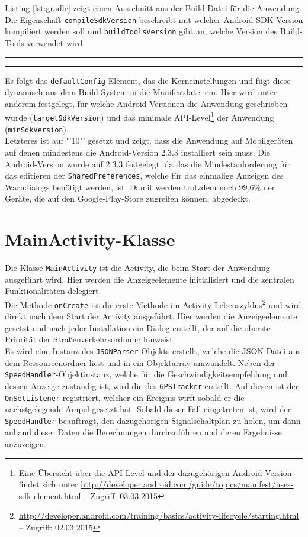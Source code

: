 Listing \ref{lst:gradle} zeigt einen Ausschnitt aus der Build-Datei für die Anwendung. \\
Die Eigenschaft \texttt{compileSdkVersion} beschreibt mit welcher Android \gls{SDK} Version kompiliert werden soll und \texttt{buildToolsVersion} gibt an, welche Version des Build-Tools verwendet wird.
\begin{center}
\rule{35em}{0.5pt}  \rule{35em}{0.5pt}
\end{center}
Es folgt das \texttt{defaultConfig} Element, das die Kerneinstellungen und fügt diese dynamisch aus dem Build-System in die  Manifestdatei ein. Hier wird unter anderem festgelegt, für welche Android Versionen die Anwendung geschrieben wurde (\texttt{targetSdkVersion}) und das minimale \gls{API}-Level\footnote{ Eine Übersicht über die \gls{API}-Level und der dazugehörigen Android-Version findet sich unter \url{http://developer.android.com/guide/topics/manifest/uses-sdk-element.html} -- Zugriff: 03.03.2015} der Anwendung (\texttt{minSdkVersion}).\\ 
Letzteres ist auf "'10"' gesetzt und zeigt, dass die Anwendung auf Mobilgeräten auf denen mindestens die Android-Version 2.3.3 installiert sein muss. 
Die Android-Version wurde auf 2.3.3 festgelegt, da das die Mindestanforderung für das editieren der \texttt{SharedPreferences}, welche für das einmalige Anzeigen des Warndialogs benötigt werden, ist. Damit werden trotzdem noch 99,6\% der Geräte, die auf den Google-Play-Store zugreifen können, abgedeckt. \cite{android_version} 
%
%
\clearpage
\section{MainActivity-Klasse}
Die Klasse \texttt{MainActivity} ist die \gls{Activity}, die beim Start der Anwendung ausgeführt wird.  Hier werden die Anzeigeelemente initialisiert und die zentralen Funktionalitäten delegiert.\\
Die Methode \texttt{onCreate} ist die erste Methode im \gls{Activity}-Lebenszyklus\footnote{ \url{http://developer.android.com/training/basics/activity-lifecycle/starting.html} -- Zugriff: 02.03.2015} und wird direkt nach dem Start der \gls{Activity} ausgeführt. Hier werden die Anzeigeelemente gesetzt und nach jeder Installation ein Dialog erstellt, der auf die oberste Priorität der Straßenverkehrsordnung hinweist.\\
Es wird eine Instanz des \texttt{JSONParser}-Objekts erstellt, welche die \gls{JSON}-Datei aus dem Ressourcenordner liest und in ein Objektarray umwandelt. Neben der \texttt{SpeedHandler}-Objektinstanz, welche für die Geschwindigkeitsempfehlung und dessen Anzeige zuständig ist, wird die des \texttt{GPSTracker} erstellt. Auf diesen ist der \texttt{OnSetListener} registriert, welcher ein Ereignis wirft sobald er die nächstgelegende Ampel gesetzt hat. Sobald dieser Fall eingetreten ist, wird der \texttt{SpeedHandler} beauftragt, den dazugehörigen Signalschaltplan zu holen, um dann anhand dieser Daten die Berechnungen durchzuführen und deren Ergebnisse anzuzeigen.   
%
%
